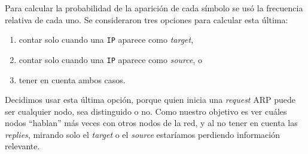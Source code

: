 \begin{enumerate}
    Para calcular la probabilidad de la aparición de cada símbolo se usó la
    frecuencia relativa de cada uno. Se consideraron tres opciones para
    calcular esta última:
    \begin{enumerate}
        \item contar solo cuando una \texttt{IP} aparece como \emph{target},
        \item contar solo cuando una \texttt{IP} aparece como \emph{source}, o
        \item tener en cuenta ambos casos.
    \end{enumerate}
    Decidimos usar esta última opción, porque quien inicia una \emph{request}
    ARP puede ser cualquier nodo, sea distinguido o no. Como nuestro objetivo
    es ver cuáles nodos ``hablan'' más veces con otros nodos de la red, y al
    no tener en cuenta las \emph{replies}, mirando solo el \emph{target} o el
    \emph{source} estaríamos perdiendo información relevante.

\end{enumerate}

